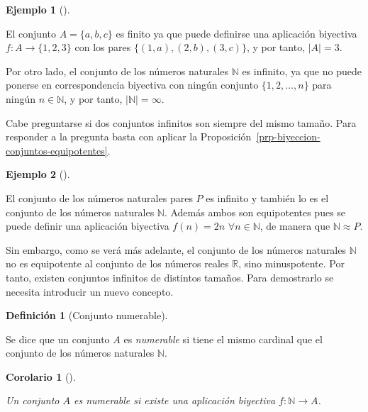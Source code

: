 \documentclass[
  a4paper,
]{scrreport}
\theoremstyle{plain}
\newtheorem{corollary}{Corolario}[chapter]
\theoremstyle{plain}
\theoremstyle{definition}
\newtheorem{definition}{Definición}[chapter]
\theoremstyle{definition}
\newtheorem{example}{Ejemplo}[chapter]
\theoremstyle{plain}
\theoremstyle{definition}
\theoremstyle{remark}
\begin{document}
\begin{example}[]\protect\hypertarget{exm-conjunto-finito-infinito}{}\label{exm-conjunto-finito-infinito}

El conjunto \(A=\{a, b, c\}\) es finito ya que puede definirse una
aplicación biyectiva \(f:A\rightarrow \{1, 2, 3\}\) con los pares
\(\{(1,a),(2,b), (3,c)\}\), y por tanto, \(|A| = 3\).

Por otro lado, el conjunto de los números naturales \(\mathbb{N}\) es
infinito, ya que no puede ponerse en correspondencia biyectiva con
ningún conjunto \(\{1,2,\ldots,n\}\) para ningún \(n\in\mathbb{N}\), y
por tanto, \(|\mathbb{N}|=\infty\).

\end{example}

Cabe preguntarse si dos conjuntos infinitos son siempre del mismo
tamaño. Para responder a la pregunta basta con aplicar la
Proposición~\ref{prp-biyeccion-conjuntos-equipotentes}.

\begin{example}[]\protect\hypertarget{exm-conjunto-pares-equipotente-naturales}{}\label{exm-conjunto-pares-equipotente-naturales}

El conjunto de los números naturales pares \(P\) es infinito y también
lo es el conjunto de los números naturales \(\mathbb{N}\). Además ambos
son equipotentes pues se puede definir una aplicación biyectiva
\(f(n) = 2n\) \(\forall n\in\mathbb{N}\), de manera que
\(\mathbb{N}\approx P\).

\end{example}

Sin embargo, como se verá más adelante, el conjunto de los números
naturales \(\mathbb{N}\) no es equipotente al conjunto de los números
reales \(\mathbb{R}\), sino minuspotente. Por tanto, existen conjuntos
infinitos de distintos tamaños. Para demostrarlo se necesita introducir
un nuevo concepto.

\begin{definition}[Conjunto
numerable]\protect\hypertarget{def-conjuntos-numerables}{}\label{def-conjuntos-numerables}

Se dice que un conjunto \(A\) es \emph{numerable} si tiene el mismo
cardinal que el conjunto de los números naturales \(\mathbb{N}\).

\end{definition}

\begin{corollary}[]\protect\hypertarget{cor-biyeccion-conjunto-numerable}{}\label{cor-biyeccion-conjunto-numerable}

Un conjunto \(A\) es numerable si existe una aplicación biyectiva
\(f:\mathbb{N}\rightarrow A\).

\end{corollary}
\end{document}
